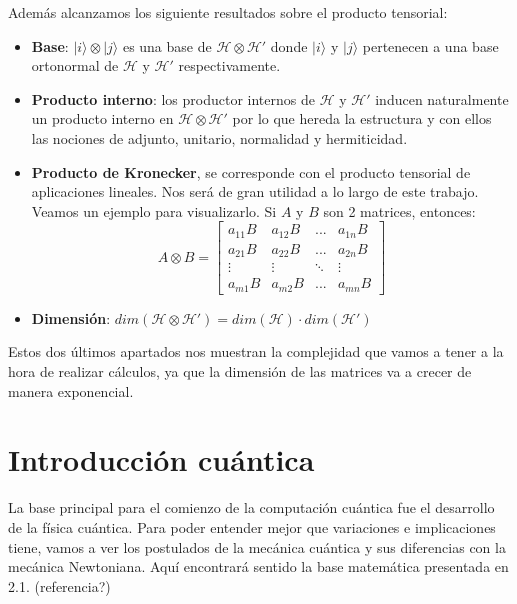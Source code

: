 Además alcanzamos los siguiente resultados sobre el producto tensorial:
\begin{itemize}
    \item \textbf{Base}: $|i\rangle \otimes |j\rangle$ es una base de $\mathscr{H} \otimes \mathscr{H}'$ donde $|i\rangle$ y $|j\rangle$ pertenecen a una base ortonormal de $\mathscr{H}$ y $\mathscr{H}'$ respectivamente. 
    
    \item \textbf{Producto interno}: los productor internos de $\mathscr{H}$ y $\mathscr{H}'$ inducen naturalmente un producto interno en $\mathscr{H} \otimes \mathscr{H}'$ por lo que hereda la estructura y con ellos las nociones de adjunto, unitario, normalidad y hermiticidad.
    
    \item \textbf{Producto de Kronecker}, se corresponde con el producto tensorial de aplicaciones lineales. Nos será de gran utilidad a lo largo de este trabajo. Veamos un ejemplo para visualizarlo. Si $A$ y $B$ son 2 matrices, entonces:\newline
        \begin{equation*}
        A\otimes B = \begin{bmatrix}
        a_{11}B & a_{12}B & ... & a_{1n}B\\
        a_{21}B & a_{22}B & ... & a_{2n}B\\
        \vdots & \vdots & \ddots & \vdots\\
        a_{m1}B & a_{m2}B & ... & a_{mn}B
        \end{bmatrix}
        \end{equation*}

    \item \textbf{Dimensión}: $dim(\mathscr{H} \otimes \mathscr{H}')=dim(\mathscr{H})\cdot dim(\mathscr{H}')$
\end{itemize}

Estos dos últimos apartados nos muestran la complejidad que vamos a tener a la hora de realizar cálculos, ya que la dimensión de las matrices va a crecer de manera exponencial.

\newpage

\section{Introducción cuántica}
La base principal para el comienzo de la computación cuántica fue el desarrollo de la física cuántica. Para poder entender mejor que variaciones e implicaciones tiene, vamos a ver los postulados de la mecánica cuántica y sus diferencias con la mecánica Newtoniana. Aquí encontrará sentido la base matemática presentada en 2.1. (referencia?)

